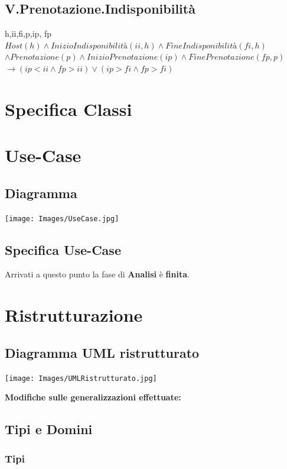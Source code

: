 \documentclass[12pt, letterpaper]{article}
\begin{document}
\subsection{V.Prenotazione.Indisponibilità}
\forall h,ii,fi,p,ip, fp \space $ Host(h) \land InizioIndisponibilità(ii,h) \land FineIndisponibilità(fi,h)$\\ $\land Prenotazione(p) \land InizioPrenotazione(ip) \land FinePrenotazione(fp,p)$\\ $\rightarrow (ip<ii \land fp>ii) \lor (ip>fi \land fp>fi)$
\newpage
\section{Specifica Classi}

\section{Use-Case}
\subsection{Diagramma}
\begin{center}
    \texttt{[image: Images/UseCase.jpg]}
\end{center} 
\newpage
\subsection{Specifica Use-Case}

    



\newpage
Arrivati a questo punto la fase di \textbf{Analisi} è \textbf{finita}.
\section{Ristrutturazione}
\subsection{Diagramma UML ristrutturato}
\begin{center}
    \texttt{[image: Images/UMLRistrutturato.jpg]}
\end{center} 
\newpage
\textbf{Modifiche sulle generalizzazioni effettuate:}\\


\subsection{Tipi e Domini}
\subsubsection{Tipi}
\end{document}
